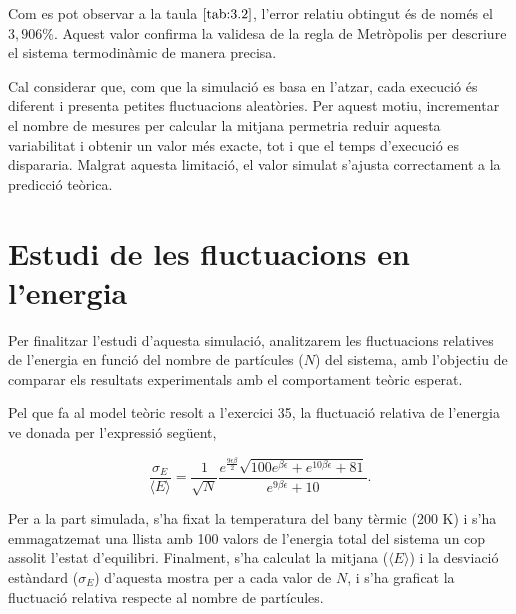 \documentclass[a4paper,10.5pt]{report}
\begin{document}
Com es pot observar a la taula $\ref{tab:3.2}$, l'error relatiu obtingut és de només el $3,906\%$. Aquest valor confirma la validesa de la regla de Metròpolis per descriure el sistema termodinàmic de manera precisa. 

Cal considerar que, com que la simulació es basa en l'atzar, cada execució és diferent i presenta petites fluctuacions aleatòries. Per aquest motiu, incrementar el nombre de mesures per calcular la mitjana permetria reduir aquesta variabilitat i obtenir un valor més exacte, tot i que el temps d'execució es dispararia. Malgrat aquesta limitació, el valor simulat s'ajusta correctament a la predicció teòrica.


\section{Estudi de les fluctuacions en l'energia}

Per finalitzar l'estudi d'aquesta simulació, analitzarem les fluctuacions relatives de l'energia en funció del nombre de partícules ($N$) del sistema, amb l'objectiu de comparar els resultats experimentals amb el comportament teòric esperat.

Pel que fa al model teòric resolt a l'exercici 35, la fluctuació relativa de l'energia ve donada per l'expressió següent,

\begin{equation}
	\frac{\sigma_E}{\langle E \rangle} = \frac{1}{\sqrt{N}} \frac{e^{\frac{9\epsilon\beta}{2}} \sqrt{100e^{\beta\epsilon} + e^{10\beta\epsilon} + 81}}{e^{9\beta\epsilon} + 10}.
\end{equation}

Per a la part simulada, s'ha fixat la temperatura del bany tèrmic (200 K) i s'ha emmagatzemat una llista amb 100 valors de l'energia total del sistema un cop assolit l'estat d'equilibri. Finalment, s'ha calculat la mitjana ($\langle E \rangle$) i la desviació estàndard ($\sigma_E$) d'aquesta mostra per a cada valor de $N$, i s'ha graficat la fluctuació relativa respecte al nombre de partícules.
\end{document}

